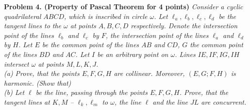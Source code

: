 \documentclass[12pt]{extarticle}
\begin{document}
\textbf{Problem 4. (Property of Pascal Theorem for 4 points)}
\textit{
Consider a cyclic quadrilateral \(ABCD\), which is inscribed in circle 
\(\omega\). Let \(\ell_a, \ell_b, \ell_c, \ell_d\) be the tangent 
lines to the \(\omega\) at points \(A,B,C,D\) respectively. 
Denote the intersection point of the lines \(\ell_b\) and \(\ell_c\) 
by \(F\), the intersection point of the lines \(\ell_a\) and \(\ell_d\) 
by \(H\). Let \(E\) be the common point of the lines \(AB\) and 
\(CD\), \(G\) the common point of the lines \(BD\) and \(AC\). 
Let \(I\) be an arbitrary point on \(\omega\). Lines \(IE, IF, IG, IH\) 
intersect \(\omega\) at points \(M,L,K,J\).\\
(a) Prove, that the points \(E,F,G,H\) are collinear. Moreover, 
\((E,G;F,H)\) is harmonic. (Show that) \\
(b) Let \(\ell\) be the line, passing through the points \(E,F,G,H\). 
Prove, that the tangent lines at \(K,M\) -- \(\ell_k, \ell_m\) 
to \(\omega\), the line \(\ell\) and the line \(JL\) are concurrent.
}
\end{document}
